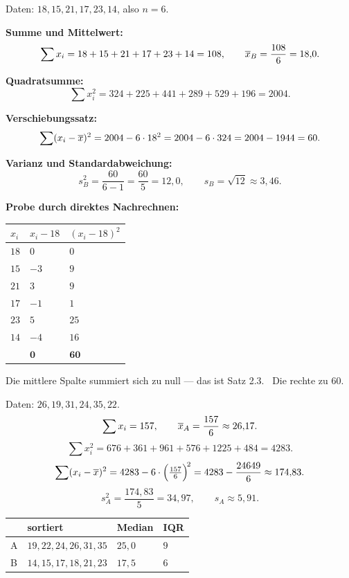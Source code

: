 \begin{merksatz}
Daten: $18, 15, 21, 17, 23, 14$, also $n = 6$.

\textbf{Summe und Mittelwert:}
\[ \sum x_i = 18+15+21+17+23+14 = 108, \qquad \overline{x}_B = \frac{108}{6} = 18{,}0 . \]

\textbf{Quadratsumme:}
\[ \sum x_i^2 = 324 + 225 + 441 + 289 + 529 + 196 = 2004 . \]

\textbf{Verschiebungssatz:}
\[ \sum (x_i - \overline{x})^2 = 2004 - 6 \cdot 18^2 = 2004 - 6 \cdot 324 = 2004 - 1944 = 60 . \]

\textbf{Varianz und Standardabweichung:}
\[ s_B^2 = \frac{60}{6-1} = \frac{60}{5} = 12{,}0, \qquad s_B = \sqrt{12} \approx 3{,}46 . \]

\textbf{Probe durch direktes Nachrechnen:}
\begin{center}
{\small
\renewcommand{\arraystretch}{1.35}
\begin{tabular}{@{}P{1.2cm}P{1.6cm}P{1.8cm}@{}}
\toprule
$x_i$ & $x_i - 18$ & $(x_i-18)^2$\\
\midrule
$18$ & $0$ & $0$\\
$15$ & $-3$ & $9$\\
$21$ & $3$ & $9$\\
$17$ & $-1$ & $1$\\
$23$ & $5$ & $25$\\
$14$ & $-4$ & $16$\\
\midrule
& $\mathbf{0}$ & $\mathbf{60}$\\
\bottomrule
\end{tabular}}
\end{center}
Die mittlere Spalte summiert sich zu null --- das ist Satz 2.3. \checkmark\ Die rechte zu $60$. \checkmark

Daten: $26, 19, 31, 24, 35, 22$.
\[ \sum x_i = 157, \qquad \overline{x}_A = \frac{157}{6} \approx 26{,}17 . \]
\[ \sum x_i^2 = 676+361+961+576+1225+484 = 4283 . \]
\[ \sum (x_i-\overline{x})^2 = 4283 - 6\cdot\Bigl(\tfrac{157}{6}\Bigr)^{\!2} = 4283 - \frac{24649}{6} \approx 174{,}83 . \]
\[ s_A^2 = \frac{174{,}83}{5} = 34{,}97, \qquad s_A \approx 5{,}91 . \]

\begin{center}
{\small
\renewcommand{\arraystretch}{1.42}
\begin{tabular}{@{}P{1.6cm}P{3.4cm}P{1.4cm}P{1.4cm}@{}}
\toprule
& \textbf{sortiert} & \textbf{Median} & \textbf{IQR}\\
\midrule
A & $19, 22, 24, 26, 31, 35$ & $25{,}0$ & $9$\\
B & $14, 15, 17, 18, 21, 23$ & $17{,}5$ & $6$\\
\bottomrule
\end{tabular}}
\end{center}


\end{merksatz}
